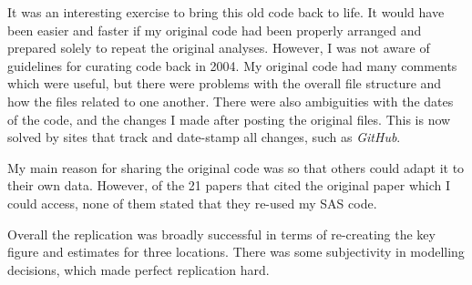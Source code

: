 It was an interesting exercise to bring this old code back to life. It would have been easier and faster if my original code had been properly arranged and prepared solely to repeat the original analyses. However, I was not aware of guidelines for curating code back in 2004. My original code had many comments which were useful, but there were problems with the overall file structure and how the files related to one another. There were also ambiguities with the dates of the code, and the changes I made after posting the original files. This is now solved by sites that track and date-stamp all changes, such as \textit{GitHub}.

My main reason for sharing the original code was so that others could adapt it to their own data. However, of the 21 papers that cited the original paper which I could access, none of them stated that they re-used my SAS code. 


Overall the replication was broadly successful in terms of re-creating the key figure and estimates for three locations. There was some subjectivity in modelling decisions, which made perfect replication hard.

